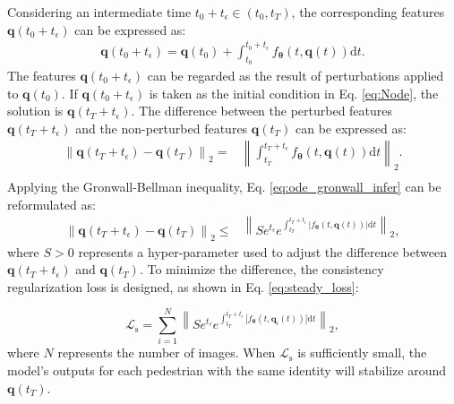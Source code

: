\documentclass[12pt]{spieman}  %
\begin{document}
\begin{spacing}{2}
Considering an intermediate time $t_0+t_{\epsilon} \in (t_0, t_T)$, the corresponding features $\boldsymbol{q}(t_0+t_{\epsilon} )$ can be expressed as:
\begin{equation}
	\label{eq:ode_intermeidate}
	\begin{aligned}
		\boldsymbol{q}(t_0+t_{\epsilon} ) = \boldsymbol{q}(t_0) + \int_{t_0}^{t_0+t_{\epsilon}}f_{\boldsymbol{\theta}}(t, \boldsymbol q(t))\mathrm{d}t.
	\end{aligned}
\end{equation}
The features $\boldsymbol{q}(t_0+t_{\epsilon} )$ can be regarded as the result of perturbations applied to $\boldsymbol{q}(t_0)$. If $\boldsymbol{q}(t_0+t_{\epsilon} )$ is taken as the initial condition in Eq. \eqref{eq:Node}, the solution is $\boldsymbol{q}(t_T + t_{\epsilon})$. The difference between the perturbed features $\boldsymbol{q}(t_T+t_{\epsilon})$ and the non-perturbed features $\boldsymbol{q}(t_T)$ can be expressed as:
\begin{equation}
	\label{eq:ode_gronwall_infer}
	\begin{aligned}
		\left\| \boldsymbol{q}(t_T+t_{\epsilon})-\boldsymbol q(t_T)\right\|_{2}=&\left\| \int_{t_T}^{t_T+t_{\epsilon}}f_{\boldsymbol{\theta}}(t, \boldsymbol q(t))\mathrm{d}t\right\|_{2}. \\
	\end{aligned}
\end{equation}
Applying the Gronwall-Bellman inequality, Eq. \eqref{eq:ode_gronwall_infer} can be reformulated as:
\begin{equation}
	\label{eq:ode_gronwall_infer2}
	\begin{aligned}
		\left\| \boldsymbol{q}(t_T+t_{\epsilon})-\boldsymbol q(t_T)\right\|_{2}
		\leq&\left\|Se^{t_{\epsilon}}e^{\int_{t_T}^{t_T+t_{\epsilon}}\left|f_{\boldsymbol{\theta}}(t, \boldsymbol q(t))\right| \mathrm{d}t}\right\|_{2},
	\end{aligned}
\end{equation}
where $S>0$ represents a hyper-parameter used to adjust the difference between $\boldsymbol{q}(t_T+t_{\epsilon})$ and $\boldsymbol{q}(t_T)$. To minimize the difference, the consistency regularization loss is designed, as shown in Eq. \eqref{eq:steady_loss}:

\begin{equation}
	\label{eq:steady_loss}
	\mathcal{L}_{\text{s}}=\sum_{i=1}^{N}\left\|S e^{t_{\epsilon}}e^{\int_{t_T}^{t_T+t_{\epsilon}}\left|f_{\boldsymbol{\theta}}(t, \boldsymbol q_i(t))\right| \mathrm{d}t}\right\|_{2},
\end{equation}
where $N$ represents the number of images. When $\mathcal{L}_{\text{s}}$ is sufficiently small, the model's outputs for each pedestrian with the same identity will stabilize around $\boldsymbol{q}(t_T)$.


\end{spacing}
\end{document}
